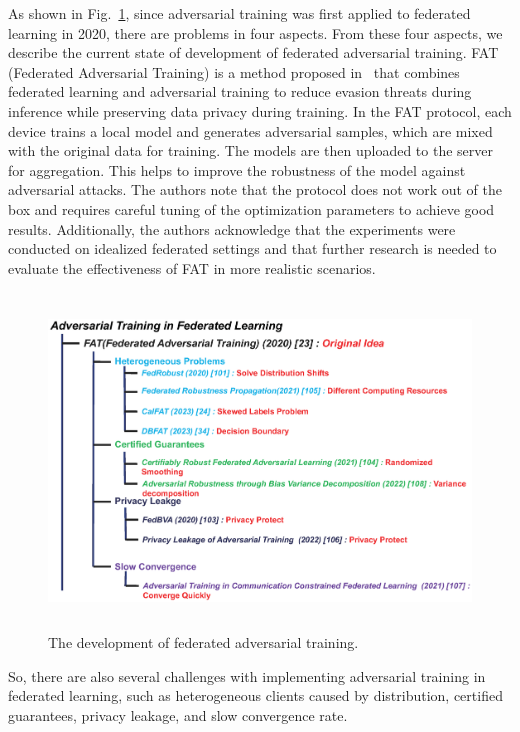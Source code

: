 \documentclass[pdflatex,sn-mathphys-num]{sn-jnl}%
\theoremstyle{thmstyleone}%
\theoremstyle{thmstyletwo}%
\theoremstyle{thmstylethree}%
\begin{document}
As shown in Fig.~\ref{fig20}, since adversarial training was first applied to
federated learning in 2020, there are problems in four
aspects. From these four aspects, we describe the current
state of development of federated adversarial training.
FAT (Federated Adversarial Training) is a method
proposed in~\cite{zizzo2020fat} that combines federated learning and
adversarial training to reduce evasion threats during
inference while preserving data privacy during training.
In the FAT protocol, each device trains a local model and
generates adversarial samples, which are mixed with the
original data for training. The models are then uploaded
to the server for aggregation. This helps to improve the
robustness of the model against adversarial attacks. The
authors note that the protocol does not work out of
the box and requires careful tuning of the optimization
parameters to achieve good results. Additionally, the
authors acknowledge that the experiments were conducted
on idealized federated settings and that further research
is needed to evaluate the effectiveness of FAT in more
realistic scenarios.

\begin{figure}[h]
	\centering
	\includegraphics[width=1.0\linewidth,height=3.5in]{output/fig20.eps}
	\caption{The development of federated adversarial training.}
	\label{fig20}
\end{figure}


So, there are also several challenges with
implementing adversarial training in federated learning, such as
heterogeneous clients caused by distribution, certified
guarantees, privacy leakage, and slow convergence rate.
\end{document}
